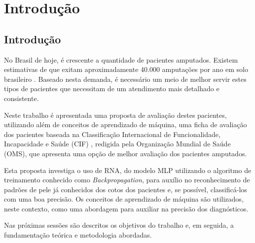 \part{Introdução}
\chapter[Introdução]{Introdução}

No Brasil de hoje, é crescente a quantidade de pacientes amputados. Existem estimativas de que exitam aproximadamente 40.000 amputações por ano em solo brasileiro \cite{Reis2012}. Baseado nesta demanda, é necessário um meio de melhor servir estes tipos de pacientes que necessitam de um atendimento mais detalhado e consistente.

Neste trabalho é apresentada uma proposta de avaliação destes pacientes,  utilizando além de conceitos de aprendizado de máquina, uma ficha de avaliação dos pacientes baseada na Classificação Internacional de Funcionalidade, Incapacidade e Saúde (CIF) \cite{OMS2004}, redigida pela Organização Mundial de Saúde (OMS), que apresenta uma opção de melhor avaliação dos pacientes amputados.

Esta proposta investiga o uso de RNA, do modelo MLP utilizando o algoritmo de treinamento conhecido como \textit{Backpropagation}, para auxílio no reconhecimento de padrões de pele já conhecidos dos cotos dos pacientes e, se possível, classificá-los com uma boa precisão. Os conceitos de aprendizado de máquina são utilizados, neste contexto, como uma abordagem para auxiliar na precisão dos diagnósticos.

Nas próximas sessões são descritos os objetivos do trabalho e, em seguida, a fundamentação teórica e metodologia abordadas.
